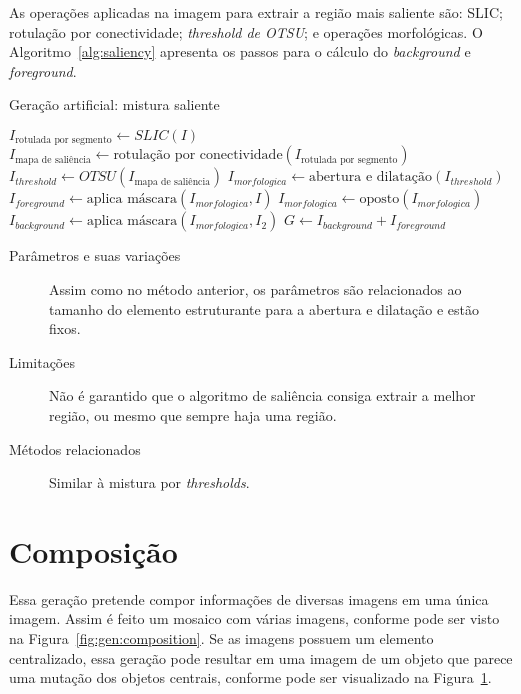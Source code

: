 As operações aplicadas na imagem para extrair a região mais saliente são: SLIC; rotulação por conectividade; \textit{threshold de OTSU}; e operações morfológicas. O Algoritmo~\ref{alg:saliency} apresenta os passos para o cálculo do \textit{background} e \textit{foreground}.

\vspace{0.5cm}
\begin{algorithm}[!htbp]
  \caption{Geração artificial: mistura saliente}
  \label{alg:saliency}
  \SetAlgoLined

  $I_{\text{rotulada por segmento}} \gets SLIC(I)$\;
  $I_{\text{mapa de saliência}} \gets \text{rotulação por conectividade}(I_{\text{rotulada por segmento}})$\;
  $I_{threshold} \gets OTSU(I_{\text{mapa de saliência}})$\;
  $I_{morfologica} \gets \text{abertura e dilatação} (I_{threshold})$\;
  $I_{foreground} \gets \text{aplica máscara}(I_{morfologica}, I) $\;
  $I_{morfologica} \gets \text{oposto}(I_{morfologica})$\;
  $I_{background} \gets \text{aplica máscara}(I_{morfologica}, I_2) $\;
  $G \gets I_{background} + I_{foreground}$\;
\end{algorithm}
\vspace{0.5cm}

\begin{description}
  \item[Parâmetros e suas variações] Assim como no método anterior, os parâmetros são relacionados ao tamanho do elemento estruturante para a abertura e dilatação e estão fixos.

  \item[Limitações] Não é garantido que o algoritmo de saliência consiga extrair
  a melhor região, ou mesmo que sempre haja uma região.

  \item[Métodos relacionados] Similar à mistura por \textit{thresholds}.

\end{description}
\section{Composição}

Essa geração pretende compor informações de diversas imagens em uma única imagem. Assim é feito um mosaico com várias imagens, conforme pode ser visto na  Figura~\ref{fig:gen:composition}. Se as imagens possuem um elemento centralizado, essa geração pode resultar em uma imagem de um objeto que parece uma mutação dos objetos centrais, conforme pode ser visualizado na Figura~\ref{}.

